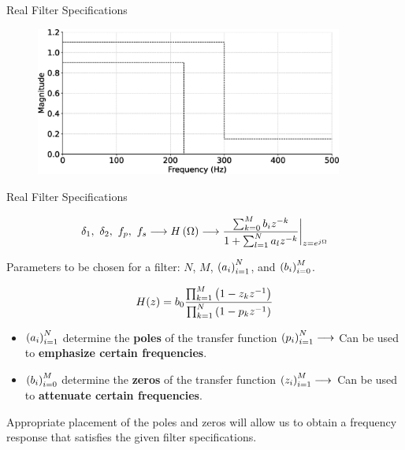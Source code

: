\documentclass[aspectratio=169]{beamer}
\let\olditem\item
\renewcommand{\item}{\setlength{\itemsep}{\fill}\olditem}
\def\lp{\ensuremath\left(}
\def\rp{\ensuremath\right)}
\begin{document}
\begin{frame}[t]{Real Filter Specifications}
  \begin{figure}
  \centering
  \includegraphics[width=0.9\textwidth]{img/filtspec.eps}
  \end{figure}
\end{frame}


\begin{frame}[t]{Real Filter Specifications}
\begin{Large}
  \[ \delta_1, \,\, \delta_2, \,\, f_p, \,\, f_s \longrightarrow H\lp \Omega \rp \longrightarrow \frac{\sum_{k=0}^M b_i z^{-k}}{1 + \sum_{l=1}^N a_l z^{-k}}\bigg\vert_{z = e^{j\Omega}} \]
\end{Large}

Parameters to be chosen for a filter: $N$, $M$, $\lp a_i \rp_{i=1}^N$, and $\lp b_i \rp_{i=0}^M$.

\[ H(z) = b_0 \frac{\prod_{k=1}^M \lp 1 - z_kz^{-1}\rp}{\prod_{k=1}^N \lp 1 - p_kz^{-1}\rp} \]

\begin{itemize}
  \item $\lp a_i \rp_{i=1}^N$ determine the \textbf{poles} of the transfer function $\lp p_i \rp_{i=1}^N \longrightarrow$ Can be used to \textbf{emphasize certain frequencies}.
  \item $\lp b_i \rp_{i=0}^M$ determine the \textbf{zeros} of the transfer function  $\lp z_i \rp_{i=1}^M \longrightarrow$ Can be used to \textbf{attenuate certain frequencies}.
\end{itemize}

Appropriate placement of the poles and zeros will allow us to obtain a frequency response that satisfies the given filter specifications.
\end{frame}
\end{document}
